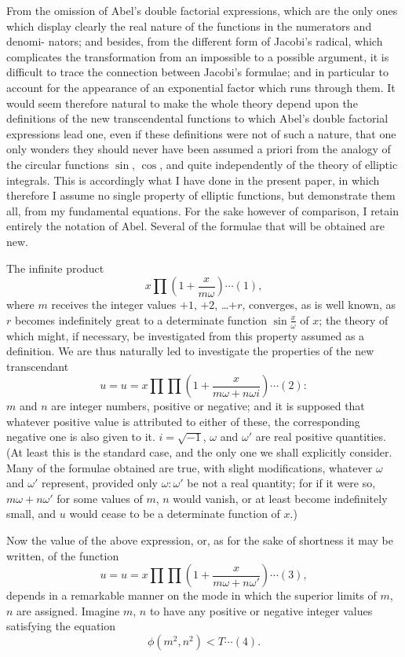 \documentclass[11pt,a4paper]{book}
\begin{document}
From the omission of Abel's double factorial expressions, which are the only ones
which display clearly the real nature of the functions in the numerators and denomi-
nators; and besides, from the different form of Jacobi's radical, which complicates the
transformation from an impossible to a possible argument, it is difficult to trace the
connection between Jacobi's formulae; and in particular to account for the appearance
of an exponential factor which runs through them. It would seem therefore natural to
make the whole theory depend upon the definitions of the new transcendental functions
to which Abel's double factorial expressions lead one, even if these definitions were not
of such a nature, that one only wonders they should never have been assumed a priori
from the analogy of the circular functions $\sin$, $\cos$, and quite independently of the
theory of elliptic integrals. This is accordingly what I have done in the present paper,
in which therefore I assume no single property of elliptic functions, but demonstrate
them all, from my fundamental equations. For the sake however of comparison, I retain
entirely the notation of Abel. Several of the formulae that will be obtained are new.

\newpage
\setcounter{page}{137}

The infinite product
\[
x \prod \left(1 + \frac{x}{m\omega}\right) \cdots (1),
\]
where $m$ receives the integer values $+1$, $+2$, \ldots $+r$, converges, as is well known, as
$r$ becomes indefinitely great to a determinate function $\sin \frac{x}{\omega}$ of $x$; the theory of which
might, if necessary, be investigated from this property assumed as a definition. We are
thus naturally led to investigate the properties of the new transcendant
\[
u = u = x \prod \prod \left(1 + \frac{x}{m\omega + n\omega i}\right) \cdots (2):
\]
$m$ and $n$ are integer numbers, positive or negative; and it is supposed that whatever
positive value is attributed to either of these, the corresponding negative one is also
given to it. $i = \sqrt{-1}$, $\omega$ and $\omega'$ are real positive quantities. (At least this is the
standard case, and the only one we shall explicitly consider. Many of the formulae
obtained are true, with slight modifications, whatever $\omega$ and $\omega'$ represent, provided
only $\omega : \omega'$ be not a real quantity; for if it were so, $m\omega + n\omega'$ for some values of
$m$, $n$ would vanish, or at least become indefinitely small, and $u$ would cease to be
a determinate function of $x$.)

Now the value of the above expression, or, as for the sake of shortness it may
be written, of the function
\[
u = u = x \prod \prod \left(1 + \frac{x}{m\omega + n\omega'}\right) \cdots (3),
\]
depends in a remarkable manner on the mode in which the superior limits of $m$, $n$
are assigned. Imagine $m$, $n$ to have any positive or negative integer values satisfying the
equation
\[
\phi(m^2, n^2) < T \cdots (4).
\]
\end{document}
